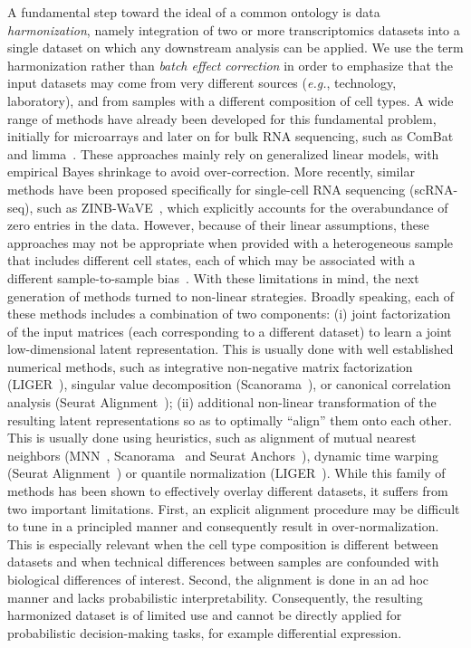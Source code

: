 A fundamental step toward the ideal of a common ontology is data \textit{harmonization}, namely integration of two or more transcriptomics datasets into a single dataset on which any downstream analysis can be applied. We use the term harmonization rather than \textit{batch effect correction} in order to emphasize that the input datasets may come from very different sources (\textit{e.g.}, technology, laboratory), and from samples with a different composition of cell types. A wide range of methods have already been developed for this fundamental problem, initially for microarrays and later on for bulk RNA sequencing, such as ComBat~\cite{combat} and limma~\cite{limma}. These approaches mainly rely on generalized linear models, with empirical Bayes shrinkage to avoid over-correction. More recently, similar methods have been proposed specifically for single-cell RNA sequencing (scRNA-seq), such as ZINB-WaVE~\cite{zinbwave}, which explicitly accounts for the overabundance of zero entries in the data. However, because of their linear assumptions, these approaches may not be appropriate when provided with a heterogeneous sample that includes different cell states, each of which may be associated with a different sample-to-sample bias~\cite{MNN}. With these limitations in mind, the next generation of methods turned to non-linear strategies. Broadly speaking, each of these methods includes a combination of two components: (i) joint factorization of the input matrices (each corresponding to a different dataset) to learn a joint low-dimensional latent representation. This is usually done with well established numerical methods, such as integrative non-negative matrix factorization (LIGER~\cite{LIGER}), singular value decomposition (Scanorama~\cite{scanorama}), or canonical correlation analysis (Seurat Alignment~\cite{seurat}); (ii) additional non-linear transformation of the resulting latent representations so as to optimally ``align'' them onto each other. This is usually done using heuristics, such as alignment of mutual nearest neighbors (MNN~\cite{MNN}, Scanorama~\cite{scanorama} and Seurat Anchors~\cite{SEURAT3}), dynamic time warping (Seurat Alignment~\cite{seurat}) or quantile normalization (LIGER~\cite{LIGER}). While this family of methods has been shown to effectively overlay different datasets, it suffers from two important limitations. First, an explicit alignment procedure may be difficult to tune in a principled manner and consequently result in over-normalization. This is especially relevant when the cell type composition is different between datasets and when technical differences between samples are confounded with biological differences of interest. Second, the alignment is done in an ad hoc manner and lacks probabilistic interpretability. Consequently, the resulting harmonized dataset is of limited use and cannot be directly applied for probabilistic decision-making tasks, for example differential expression. 


